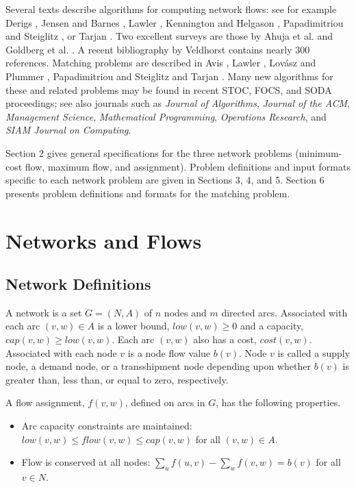 Several texts describe algorithms for computing network
flows:  see for example 
Derigs \cite{derigs}, 
Jensen and Barnes \cite{jenbar},
Lawler \cite{lawler}, 
Kennington and Helgason \cite{kenhel}, 
Papadimitriou and Steiglitz \cite{papste}, 
or Tarjan \cite{tarjan}.  Two excellent surveys are those by  
Ahuja et al. \cite{amo} and 
Goldberg et al. \cite{gtt}.  
A recent bibliography by Veldhorst \cite{veldhorst} contains nearly 
300 references.  Matching problems are described in Avis  \cite{avis},
Lawler \cite{lawler}, Lov\'{a}sz and Plummer \cite{lovplu}, Papadimitriou
and Steiglitz \cite{papste} and Tarjan \cite{tarjan}.
Many new algorithms for these and related 
problems may be found in recent STOC, FOCS, and SODA proceedings;  
see also journals such as {\em Journal of Algorithms}, {\em Journal of 
the ACM}, {\em Management Science}, {\em Mathematical Programming},
{\em Operations Research}, and  {\em SIAM Journal on Computing}.  

Section 2 gives general specifications for 
the three network problems (minimum-cost flow, maximum flow, and
assignment).   Problem definitions and input formats specific to each 
network problem are given in Sections 3, 4, and 5.  Section 6 presents 
problem definitions and formats for the matching problem. 

\section{Networks and Flows} 

\subsection{Network Definitions} 

A network is a set $G=(N,A)$ of $n$ nodes and $m$ directed arcs.
Associated with each arc $(v,w) \in A$ is a lower bound, $low(v,w)
\geq 0$ and a capacity, $cap(v,w) \geq low(v,w)$.  Each arc $(v,w)$
also has a cost, $cost(v,w)$.  Associated with each node $v$ is a node
flow value $b(v)$.  Node $v$ is called a supply node, a demand node,
or a transshipment node depending upon whether $b(v)$ is greater than,
less than, or equal to zero, respectively. 

A flow assignment, $f(v,w)$, defined on arcs in $G$, has the following
properties.
\begin{itemize}
\item Arc capacity constraints are maintained:  
$low(v,w) \leq flow(v,w) \leq cap(v,w)$ for all $(v,w) \in A$.

 \item Flow is conserved at all nodes:  
$\sum_{u} f(u,v) - \sum_{w} f(v,w) = b(v)$ for all $v \in N$.  

\end{itemize} 

